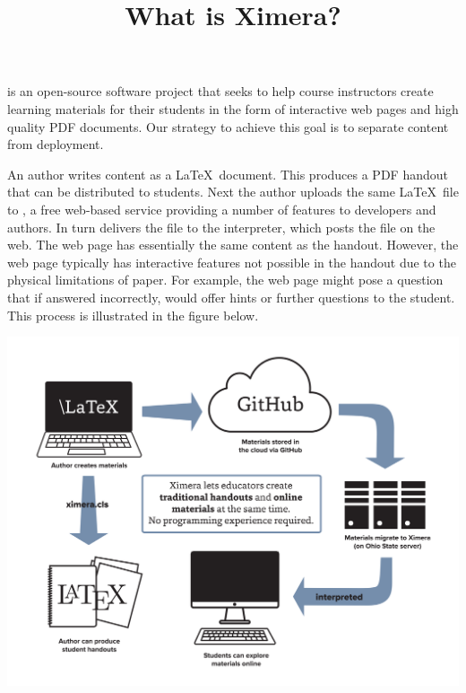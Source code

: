 \documentclass{ximera}
\title{What is Ximera?}
\begin{document}
\maketitle

 is an open-source software project that seeks to help course instructors create learning materials for their students in the form of interactive web pages and high quality PDF documents.
Our strategy to achieve this goal is to separate content from deployment.

An author writes content as a \LaTeX\ document.
This produces a PDF handout that can be distributed to students.
Next the author uploads the same \LaTeX\ file to ,
a free web-based service providing a number of features to developers and authors.
In turn  delivers the file to the  interpreter, which posts the file on the web.
The web page has essentially the same content as the handout.
However, the web page typically has interactive features not possible in the handout due to the physical limitations of paper.
For example, the web page might pose a question that if answered incorrectly, would offer hints or further questions
to the student.
This process is illustrated in the figure below.

\begin{image}
\includegraphics[scale=.25]{XimeraGraphic.png}
\end{image}
\end{document}
